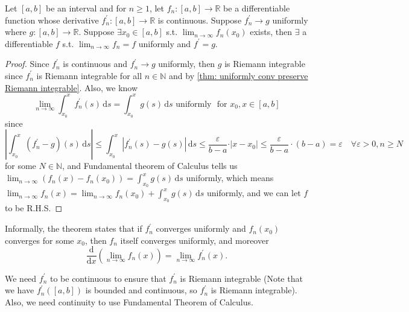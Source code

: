 \begin{theorem} \label{thm: f_n differentiable and f_n prime conti, then if f_n prime to g uni, and for some x0 lim f_n(x_0) exists, then EE f s.t. lim fn equal f uni and f prime is g}
    Let \([a, b]\) be an interval and for \(n \ge 1\), let \(f_n: [a, b] \to \mathbb{R} \) be a differentiable function whose derivative \(f_n^{\prime} : [a, b] \to  \mathbb{R} \) is continuous. Suppose \(f_n^{\prime}  \to g\) uniformly where \(g:[a, b] \to  \mathbb{R} \). Suppose \(\exists x_0 \in [a, b]\) s.t. \(\lim_{n \to \infty} f_n(x_0) \) exists, then \(\exists \) a differentiable \(f\) s.t. \(\lim_{n \to \infty} f_n = f \) uniformly and \(f^{\prime} = g\).           
\end{theorem}
\begin{proof}
    Since \(f_n^{\prime} \) is continuous and \(f_n^{\prime} \to g\) uniformly, then \(g\) is Riemann integrable since \(f_n^{\prime} \) is Riemann integrable for all \(n \in \mathbb{N} \) and by \autoref{thm: uniformly conv preserve Riemann integrable}. Also, we know 
    \[
        \lim_{n \to \infty} \int _{x_0}^x f_n^{\prime} (s) \, \mathrm{d}s = \int _{x_0}^x g(s) \, \mathrm{d} s \text{ uniformly }  \text{ for } x_0, x \in [a, b]    
    \] since
    \[
        \left\vert \int _{x_0}^x \left( f_n^{\prime} - g \right)(s) \, \mathrm{d}s   \right\vert \le \int _{x_0}^x \left\vert f_n^{\prime} (s) - g(s) \right\vert \,  \mathrm{d} s  \le \frac{\varepsilon}{b-a}  \cdot \vert x - x_0 \vert \le \frac{\varepsilon}{b - a} \cdot (b - a) = \varepsilon \quad \forall \varepsilon > 0, n \ge N
    \] for some \(N \in \mathbb{N} \), and Fundamental theorem of Calculus tells us \(\lim_{n \to \infty} \left( f_n(x) - f_n(x_0) \right) = \int _{x_0}^x g(s) \, \mathrm{d} s   \) uniformly, which means \(\lim_{n \to \infty} f_n(x) = \lim_{n \to \infty} f_n(x_0) + \int _{x_0}^x g(s) \, \mathrm{d} s  \) uniformly, and we can let \(f\) to be R.H.S.
\end{proof}

\begin{remark}
    Informally, the theorem states that if \(f_n^{\prime} \) converges uniformly and \(f_n(x_0)\) converges for some \(x_0\), then \(f_n\) itself converges uniformly, and moreover
    \[
        \frac{\mathrm{d}}{\mathrm{d}x} \left( \lim_{n \to \infty} f_n(x)  \right) = \lim_{n \to \infty} f_n^{\prime} (x).   
    \]    
\end{remark}

\begin{remark}
    We need \(f_n^{\prime} \) to be continuous to ensure that \(f_n^{\prime} \) is Riemann integrable (Note that we have \(f_n^{\prime}([a,b]) \) is bounded and continuous, so \(f_n^{\prime} \) is Riemann integrable). Also, we need continuity to use Fundamental Theorem of Calculus.  
\end{remark}

